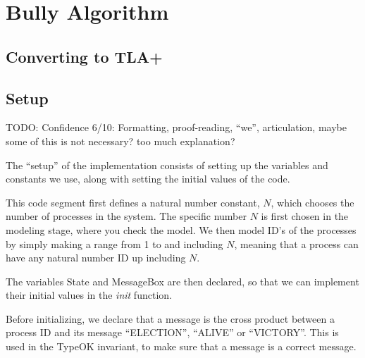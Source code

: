 \documentclass{report}
\begin{document}
\chapter{Bully Algorithm}

\section{Converting to TLA+}
\lipsum[1]

\section{Setup}
TODO: Confidence 6/10: Formatting, proof-reading, ``we'', articulation, maybe some of this is not necessary? too much explanation?

The ``setup'' of the implementation consists of setting up the variables and constants we use, along with setting the initial values of the code.

\noindent{}


This code segment first defines a natural number constant, $N$, which chooses the number of processes in the system. The specific number $N$ is first chosen in the modeling stage, where you check the model. We then model ID's of the processes by simply making a range from 1 to and including $N$, meaning that a process can have any natural number ID up including $N$.

The variables State and MessageBox are then declared, so that we can implement their initial values in the \textit{init} function.

Before initializing, we declare that a message is the cross product between a process ID and its message ``ELECTION'', ``ALIVE'' or ``VICTORY''. This is used in the TypeOK invariant, to make sure that a message is a correct message.
\end{document}
